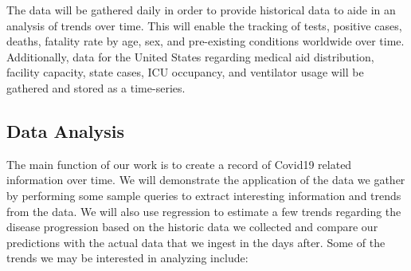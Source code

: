 \documentclass[11pt]{article}
\newcommand{\comment}[1]{{\color{red}{#1}}}
\begin{document}
\noindent
The data will be gathered daily in order to provide historical data to aide in an analysis of trends over time. This will enable the tracking of tests, positive cases, deaths, fatality rate by age, sex, and pre-existing conditions worldwide over time. Additionally, data for the United States regarding medical aid distribution, facility capacity, state cases, ICU occupancy, and ventilator usage will be gathered and stored as a time-series.






\pagebreak

\subsection{Data Analysis}

\noindent
The main function of our work is to create a record of Covid19 related information over time. We will demonstrate the application of the data we gather by performing some sample queries to extract interesting information and trends from the data. We will also use regression to estimate a few trends regarding the disease progression based on the historic data we collected and compare our predictions with the actual data that we ingest in the days after. Some of the trends we may be interested in analyzing include:
\end{document}
